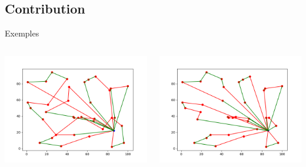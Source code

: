 \documentclass{beamer}
\begin{document}
\subsection{Contribution}

\begin{frame}{Exemples}
 \begin{columns}[t]
  \begin{column}{4cm}
  	\centering
	\includegraphics[scale=0.25]{edges101010.png}
	
  \end{column}
  
    \begin{column}{4cm}
  	\centering
	\includegraphics[scale=0.25]{edges190115.png}



\end{column}
\end{columns}
\end{frame}
\end{document}
